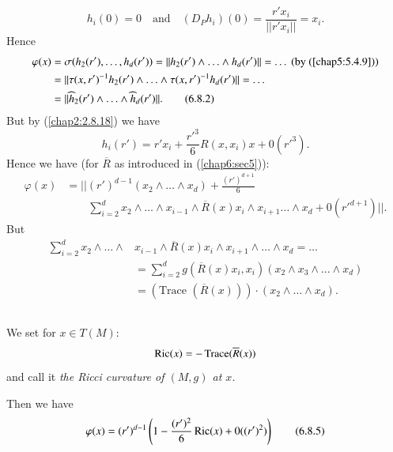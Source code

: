 $$
h_{i}(0)=0\quad\text{and}\quad
(D_{P}h_{i})(0)=\frac{r'x_{i}}{||r'x_{i}||}=x_{i}.
$$
Hence
\begin{align*}
\varphi(x) &=
\sigma(h_{2}(r'),\ldots,h_{d}(r'))=||h_{2}(r')\wedge\ldots\wedge
h_{d}(r')||=\ldots \text{ (by (\ref{chap5:5.4.9}))}\\
&= ||\tau(x,r')^{-1}h_{2}(r')\wedge\ldots
\wedge\tau(x,r')^{-1}h_{d}(r')||=\ldots\\
&= ||\widehat{h}_{2}(r')\wedge\ldots\wedge\widehat{h}_{d}(r')||.\tag{6.8.2}\label{chap6:6.8.2}
\end{align*}
But by (\ref{chap2:2.8.18}) we have
$$
h_{i}(r')=r'x_{i}+\frac{{r'}^{3}}{6}R(x,x_{i})x+0({r'}^{3}).
$$
Hence we have (for $\overline{R}$ as introduced in (\ref{chap6:sec5})):
\begin{align*}
\varphi(x)&=||(r')^{d-1}(x_{2}\wedge\ldots\wedge
x_{d})+\frac{(r')^{d+1}}{6}\\
&\qquad\sum^{d}_{i=2}x_{2}\wedge\ldots\wedge
x_{i-1}\wedge \overline{R}(x)x_{i}\wedge x_{i+1}\ldots\wedge
x_{d}+0({r'}^{d+1})||.\tag{6.8.3}\label{chap6:6.8.3}
\end{align*}
But\pageoriginale
\begin{align*}
\sum^{d}_{i=2}x_{2}\wedge\ldots\wedge
& x_{i-1}\wedge\overline{R}(x)x_{i}\wedge x_{i+1}\wedge\ldots\wedge
x_{d}=\ldots\\
& =\sum^{d}_{i=2}g(\overline{R}(x)x_{i},x_{i})(x_{2}\wedge
x_{3}\wedge\ldots\wedge x_{d})\\
&= (\text{Trace } (\overline{R}(x)))\cdot (x_{2}\wedge\ldots\wedge x_{d}).
\end{align*}

\setcounter{subsection}{3}

\subsection{}\label{chap6:6.8.4}

\begin{defi*}
We set for $x\in T(M)$:
$$
\operatorname{Ric}(x)=-\operatorname{Trace} (\overline{R}(x))
$$
and call it {\em the Ricci curvature of $(M,g)$ at $x$.}

Then we have
\begin{equation*}
\varphi(x)=(r')^{d-1}\left(1-\frac{(r')^{2}}{6}\operatorname{Ric}(x)+0((r')^{2})\right)\tag{6.8.5}\label{chap6:6.8.5} 
\end{equation*}
\end{defi*}

\setcounter{subsection}{5}

